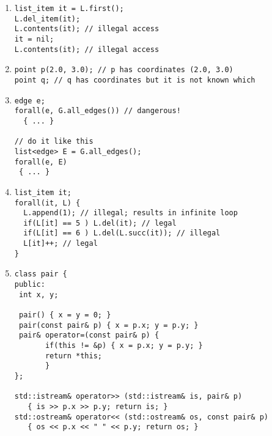 \begin{enumerate}
\begin{enumerate}
          
\end{enumerate}



        




        \item 
\begin{verbatim}list_item it = L.first();
L.del_item(it);
L.contents(it); // illegal access
it = nil;
L.contents(it); // illegal access
\end{verbatim}
        


        \item 
\begin{verbatim}point p(2.0, 3.0); // p has coordinates (2.0, 3.0)
point q; // q has coordinates but it is not known which
\end{verbatim}
        



        \item 
\begin{verbatim}edge e;
forall(e, G.all_edges()) // dangerous!
  { ... } 

// do it like this
list<edge> E = G.all_edges();
forall(e, E) 
 { ... }
\end{verbatim}
        


        \item 
\begin{verbatim}list_item it;
forall(it, L) {
  L.append(1); // illegal; results in infinite loop
  if(L[it] == 5 ) L.del(it); // legal
  if(L[it] == 6 ) L.del(L.succ(it)); // illegal
  L[it]++; // legal
}
\end{verbatim}
        



        \item 
\begin{verbatim}class pair {
public:
 int x, y;

 pair() { x = y = 0; }
 pair(const pair& p) { x = p.x; y = p.y; }
 pair& operator=(const pair& p) {
       if(this != &p) { x = p.x; y = p.y; }
       return *this;
       }
};

std::istream& operator>> (std::istream& is, pair& p) 
   { is >> p.x >> p.y; return is; }
std::ostream& operator<< (std::ostream& os, const pair& p) 
   { os << p.x << " " << p.y; return os; }
\end{verbatim}
        



\end{enumerate}
